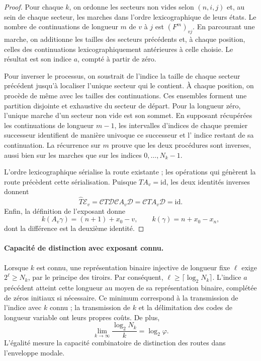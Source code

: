 \begin{proof}
Pour chaque \(k\), on ordonne les secteurs non vides selon \((n,i,j)\)
et, au sein de chaque secteur, les marches dans l'ordre lexicographique de leurs
états. Le nombre de continuations de longueur \(m\) de
\(v\) à \(j\) est \((F^m)_{vj}\). En parcourant une marche, on additionne
les tailles des secteurs précédents et, à chaque position, celles
des continuations lexicographiquement antérieures à celle choisie.
Le résultat est son indice \(a\), compté à partir de zéro.

Pour inverser le processus, on soustrait de l'indice la taille de chaque
secteur précédent jusqu'à localiser l'unique secteur qui le contient.
À chaque position, on procède de même avec les tailles des
continuations. Ces ensembles forment une partition disjointe
et exhaustive du secteur de départ. Pour la longueur zéro, l'unique
marche d'un secteur non vide est son sommet. En supposant récupérées
les continuations de longueur \(m-1\), les intervalles d'indices
de chaque premier successeur identifient de manière univoque ce successeur et l'
indice restant de sa continuation. La récurrence sur \(m\) prouve
que les deux procédures sont inverses, aussi bien sur les marches que
sur les indices \(0,\ldots,N_k-1\).

L'ordre lexicographique sérialise la route existante ; les opérations qui génèrent la route précèdent cette sérialisation. Puisque \(T A_v=\mathrm{id}\), les deux identités inverses donnent
\[
 \widehat T\mathcal E_v
 =\mathcal C T\mathcal D\mathcal C A_v\mathcal D
 =\mathcal C T A_v\mathcal D
 =\mathrm{id}.
\]
Enfin, la définition de l'exposant donne
\[
 k(A_v\gamma)=(n+1)+x_0-v,\qquad
 k(\gamma)=n+x_0-x_n,
\]
dont la différence est la deuxième identité.
\end{proof}

\paragraph{Capacité de distinction avec exposant connu.}
Lorsque \(k\) est connu, une représentation binaire injective de longueur
fixe \(\ell\) exige \(2^\ell\geq N_k\), par le principe des
tiroirs. Par conséquent,
\(\ell\geq\lceil\log_2N_k\rceil\).
L'indice \(a\) précédent atteint cette longueur au moyen de sa
représentation binaire, complétée de zéros initiaux si
nécessaire. Ce minimum correspond à la transmission de l'indice
avec \(k\) connu ; la transmission de \(k\) et la délimitation des
codes de longueur variable ont leurs propres coûts. De plus,
\[
 \lim_{k\to\infty}\frac{\log_2N_k}{k}=\log_2\varphi.
\]
L'égalité mesure la capacité combinatoire de distinction des routes dans l'enveloppe modale.

